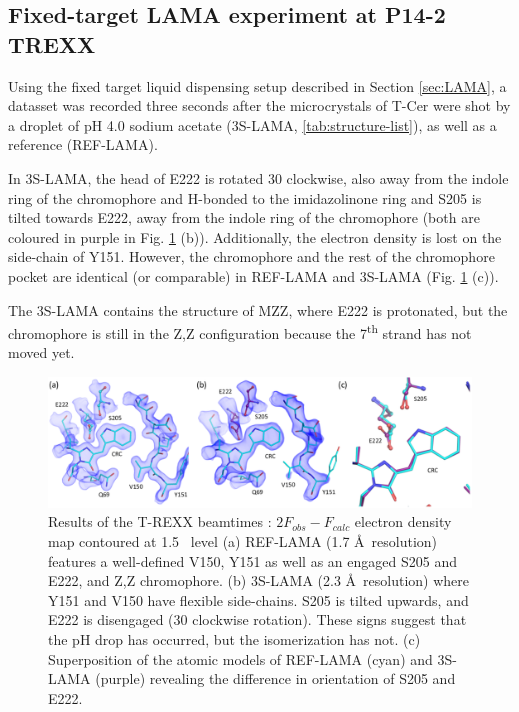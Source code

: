\subsection{Fixed-target LAMA experiment at P14-2 TREXX}\label{sec:T-REXX}

Using the fixed target liquid dispensing setup described in Section \ref{sec:LAMA}, a datasset was recorded three seconds after the microcrystals of T-Cer were shot by a droplet of pH 4.0 sodium acetate (3S-LAMA, \ref{tab:structure-list}), as well as a reference (REF-LAMA).

In 3S-LAMA, the head of E222 is rotated 30 \degree clockwise, also away from the indole ring of the chromophore and H-bonded to the imidazolinone ring  and S205 is tilted towards E222, away from the indole ring of the chromophore (both are coloured in purple in Fig. \ref{fig:T-Cer_TREXX_results} (b)). Additionally, the electron density is lost on the side-chain of Y151. However, the chromophore and the rest of the chromophore pocket are identical (or comparable) in REF-LAMA and 3S-LAMA (Fig. \ref{fig:T-Cer_TREXX_results} (c)). 

\vspace{2mm}

The 3S-LAMA contains the structure of MZZ, where E222 is protonated, but the chromophore is still in the Z,Z configuration because the 7\textsuperscript{th} strand has not moved yet.
\begin{figure}[H] %
    \centering
        \noindent \includegraphics[width=\textwidth]{images/T-Cer/TREXX_results.pdf}
    \hfill
    \caption{Results of the T-REXX beamtimes : \(2F_{obs} - F_{calc}\) electron density map contoured at 1.5 \textsigma\ level (a) REF-LAMA (1.7 \AA\ resolution) features a well-defined V150, Y151 as well as an engaged S205 and E222, and Z,Z chromophore. (b) 3S-LAMA (2.3 \AA\ resolution) where Y151 and V150 have flexible side-chains. S205 is tilted upwards, and E222 is disengaged (30 \degree clockwise rotation). These signs suggest that the pH drop has occurred, but the isomerization has not. (c) Superposition of the atomic models of REF-LAMA (cyan) and 3S-LAMA (purple) revealing the difference in orientation of S205 and E222.}\label{fig:T-Cer_TREXX_results}
\end{figure}

